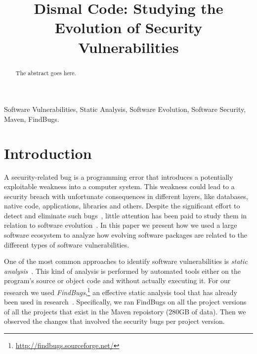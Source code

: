 \documentclass[conference]{IEEEtran}
\begin{document}
\title{Dismal Code: Studying the Evolution of Security Vulnerabilities}


\author{
\and
{}
}

\maketitle

\begin{abstract}
The abstract goes here.
\end{abstract}

\begin{IEEEkeywords}
Software Vulnerabilities, Static Analysis, Software Evolution, Software
Security, Maven, FindBugs.
\end{IEEEkeywords}

\IEEEpeerreviewmaketitle

\section{Introduction}

A security-related bug is a programming error that introduces a potentially
exploitable weakness into a computer system. This weakness could lead to a
security breach with unfortunate consequences in different layers, like databases,
native code, applications, libraries and others. Despite the significant
effort to detect and eliminate such bugs~\cite{SZ12}, little attention has been paid to
study them in relation to software evolution~\cite{L96, LRWPT97}. In this paper we present how we
used a large software ecosystem to analyze how evolving software packages are
related to the different types of software vulnerabilities.

One of the most common approaches to identify software vulnerabilities is
{\it static analysis}~\cite{CW07}. This kind of analysis is performed by automated tools
either on the program's source or object code and without actually executing
it. For our research we used {\it FindBugs},\footnote{\url{http://findbugs.sourceforge.net/}}
an effective static analysis tool that has already been used in
research~\cite{AP10, HP07}. Specifically, we ran FindBugs on all the project
versions of all the projects that exist in the Maven repoistory (280GB of
data). Then we observed the changes that involved the security bugs per project
version.
\end{document}

